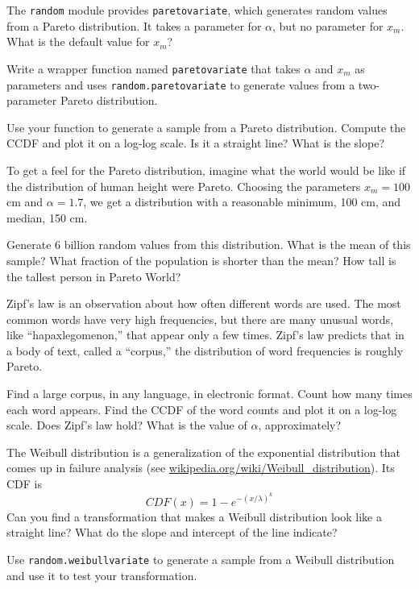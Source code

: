 \documentclass[12pt]{book}
\begin{document}
\begin{ex}

The {\tt random} module provides {\tt paretovariate},
which generates random values from a Pareto distribution.  It takes
a parameter for $\alpha$, but no parameter for $x_m$.  What is
the default value for $x_m$?

Write a wrapper function named {\tt paretovariate} that takes $\alpha$
and $x_m$ as parameters and uses {\tt random.paretovariate} to
generate values from a two-parameter Pareto distribution.

Use your function to generate a sample from a Pareto distribution.
Compute the CCDF and plot it on a log-log scale.  Is it a straight
line?  What is the slope?

\end{ex}

\begin{ex}

To get a feel for the Pareto distribution, imagine what the world
would be like if the distribution of human height were Pareto.
Choosing the parameters $x_m = 100$ cm and $\alpha = 1.7$, we
get a distribution with a reasonable minimum, 100 cm,
and median, 150 cm.

Generate 6 billion random values from this distribution.  What is the
mean of this sample?  What fraction of the population is shorter than
the mean?  How tall is the tallest person in Pareto World?

\end{ex}

\begin{ex}

Zipf's law is an observation about how often different words are used.
The most common words have very high frequencies, but there are many
unusual words, like ``hapaxlegomenon,'' that appear only a few times.
Zipf's law predicts that in a body of text, called a ``corpus,'' the
distribution of word frequencies is roughly Pareto.

Find a large corpus, in any language, in electronic
format.  Count how many times each word appears.  Find the CCDF of the
word counts and plot it on a log-log scale.  Does Zipf's law hold?
What is the value of $\alpha$, approximately?

\end{ex}

\begin{ex}
\label{weibull}

The Weibull distribution is a generalization of the exponential
distribution that comes up in failure analysis
(see \url{wikipedia.org/wiki/Weibull_distribution}).  Its CDF is
%
\[ CDF(x) = 1 - e^{-(x / \lambda)^k} \]
%
Can you find a transformation that makes a Weibull distribution look
like a straight line?  What do the slope and intercept of the
line indicate?

Use {\tt random.weibullvariate} to generate a sample from a
Weibull distribution and use it to test your transformation.

\end{ex}
\end{document}
